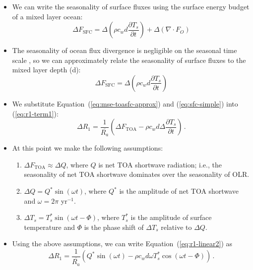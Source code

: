 \documentclass{ametsocV5}
\begin{document}
\begin{itemize}
  \item We can write the seasonality of surface fluxes using the surface energy budget of a mixed layer ocean:
        \begin{equation}
          \Delta F_{\mathrm{SFC}} = \Delta\left(\rho c_{w} d \frac{\partial T_{s}}{\partial t}\right) + \Delta ( \nabla\cdot F_{O})
        \end{equation}
  \item The seasonality of ocean flux divergence is negligible on the seasonal time scale \citep{roberts2017}, so we can approximately relate the seasonality of surface fluxes to the mixed layer depth (d):
        \begin{equation} \label{eq:sfc-simple}
          \Delta F_{\mathrm{SFC}} = \Delta\left(\rho c_{w} d \frac{\partial T_{s}}{\partial t}\right)
        \end{equation}
  \item We substitute Equation~(\ref{eq:mse-toasfc-approx}) and (\ref{eq:sfc-simple}) into (\ref{eq:r1-term1}):
        \begin{equation} \label{eq:r1-linear2}
          \Delta R_{1} = \frac{1}{\overline{R_{a}}}\left(\Delta F_{\mathrm{TOA}}-\rho c_{w} d \Delta\frac{\partial T_{s}}{\partial t}\right) \, .
        \end{equation}
  \item At this point we make the following assumptions:
        \begin{enumerate}
                \item $\Delta F_{\mathrm{TOA}} \approx \Delta Q$, where $Q$ is net TOA shortwave radiation; i.e., the seasonality of net TOA shortwave dominates over the seasonality of OLR.
                \item $\Delta Q = Q^{*}\sin(\omega t)$, where $Q^{*}$ is the amplitude of net TOA shortwave and $\omega=2\pi$ yr$^{-1}$.
                \item $\Delta T_{s} = T_{s}^{*}\sin(\omega t - \Phi)$, where $T_{s}^{*}$ is the amplitude of surface temperature and $\Phi$ is the phase shift of $\Delta T_{s}$ relative to $\Delta Q$.
        \end{enumerate}
  \item Using the above assumptions, we can write Equation~(\ref{eq:r1-linear2}) as
        \begin{equation} \label{eq:r1-linear3}
          \Delta R_{1} = \frac{1}{\overline{R_{a}}}\left(Q^{*}\sin(\omega t) -\rho c_{w} d \omega T_{s}^{*}\cos(\omega t - \Phi) \right) \, .
        \end{equation}

\end{itemize}
\end{document}
